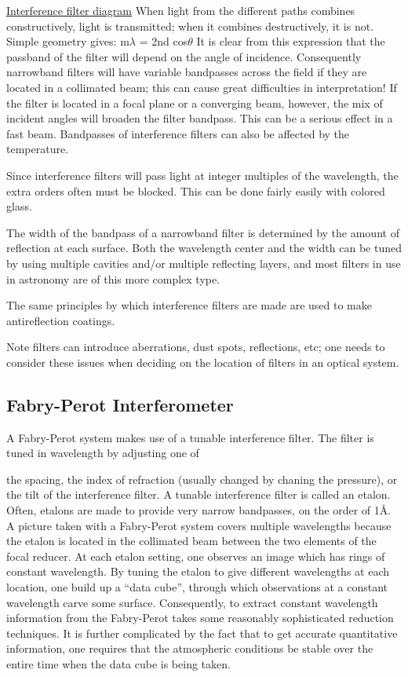 \documentclass[12pt]{article}
\begin{document}
\href{http://astronomy.nmsu.edu/holtz/a535/html/diagrams/a535/intfilt.htm}
{Interference filter diagram}
When light from the different paths
combines constructively, light is transmitted; when it combines
destructively, it is not. Simple geometry gives:
m$\displaystyle \lambda$ = 2nd cos$\displaystyle \theta$
It is clear from this expression that the passband of the filter will
depend on the angle of incidence. Consequently narrowband filters will
have variable bandpasses across the field if they are located in a
collimated beam; this can cause great difficulties in interpretation!
If the filter is located in a focal plane or a converging beam,
however, the mix of incident angles will broaden the filter bandpass.
This can be a serious effect in a fast beam. Bandpasses of
interference filters can also be affected by the temperature.

Since interference filters will pass light at integer multiples of the
wavelength, the extra orders often must be blocked. This can be done
fairly easily with colored glass.

The width of the bandpass of a narrowband filter is determined by the
amount of reflection at each surface. Both the wavelength center and
the width can be tuned by using multiple cavities and/or multiple
reflecting layers, and most filters in use in astronomy are of this
more complex type.

The same principles by which interference filters are made are used to
make antireflection coatings.

Note filters can introduce aberrations, dust spots, reflections, etc;
one needs to consider these issues when deciding on the location of
filters in an optical system.

\subsection*{Fabry-Perot Interferometer}

A Fabry-Perot system makes use of a tunable interference filter. The
filter is tuned in wavelength by adjusting one of

the spacing,
the index of refraction (usually changed by chaning the pressure), or
the tilt of the interference filter.
A tunable interference filter is called an etalon. Often, etalons are
made to provide very narrow bandpasses, on the order of 1Å.
A picture taken with a Fabry-Perot system covers multiple wavelengths
because the etalon is located in the collimated beam between the two
elements of the focal reducer. At each etalon setting, one observes an
image which has rings of constant wavelength. By tuning the etalon to
give different wavelengths at each location, one build up a ``data
cube'', through which observations at a constant wavelength carve some
surface. Consequently, to extract constant wavelength information from
the Fabry-Perot takes some reasonably sophisticated reduction
techniques. It is further complicated by the fact that to get accurate
quantitative information, one requires that the atmospheric conditions
be stable over the entire time when the data cube is being taken.
\end{document}
